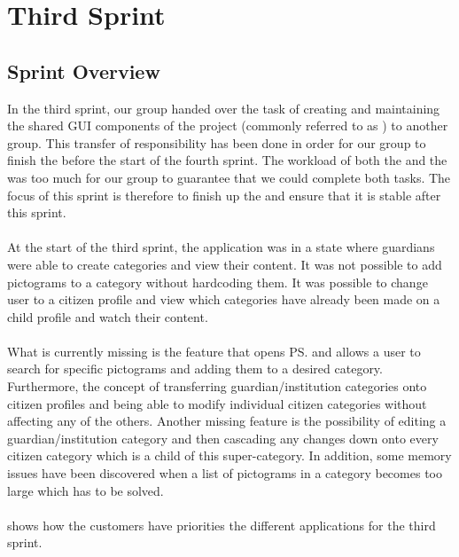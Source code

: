 \part{Third Sprint}
\label{par:third_sprint}

\chapter{Sprint Overview}
In the third sprint, our group handed over the task of creating and maintaining the shared GUI components of the project (commonly referred to as \gc) to another group. This transfer of responsibility has been done in order for our group to finish the \ct before the start of the fourth sprint. The workload of both the \ct and the \gc was too much for our group to guarantee that we could complete both tasks. The focus of this sprint is therefore to finish up the \ct and ensure that it is stable after this sprint.
\\\\
At the start of the third sprint, the application was in a state where guardians were able to create categories and view their content. It was not possible to add pictograms to a category without hardcoding them. It was possible to change user to a citizen profile and view which categories have already been made on a child profile and watch their content. 
\\\\
What is currently missing is the feature that opens \ps and allows a user to search for specific pictograms and adding them to a desired category. Furthermore, the concept of transferring guardian/institution categories onto citizen profiles and being able to modify individual citizen categories without affecting any of the others. Another missing feature is the possibility of editing a guardian/institution category and then cascading any changes down onto every citizen category which is a child of this super-category. In addition, some memory issues have been discovered when a list of pictograms in a category becomes too large which has to be solved. 
\\\\
 shows how the customers have priorities the different applications for the third sprint.

